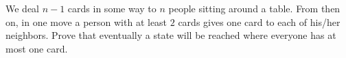 We deal $n-1$ cards in some way to $n$ people sitting around a table. From then on, in one move a person with at least $2$ cards gives one card to each of his/her neighbors. Prove that eventually a state will be reached where everyone has at most one card.
